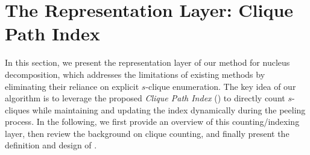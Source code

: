 \section{The Representation Layer: Clique Path Index} \label{sec:our_approach}

In this section, we present the representation layer of our method for nucleus decomposition, which addresses the limitations of existing methods by eliminating their reliance on explicit $s$-clique enumeration. 
%
The key idea of our algorithm is to leverage the proposed \textit{Clique Path Index} (\cpi) to directly count $s$-cliques while maintaining and updating the index dynamically during the peeling process. 
%
In the following, we first provide an overview of this counting/indexing layer, then review the background on clique counting, and finally present the definition and design of \cpi.





